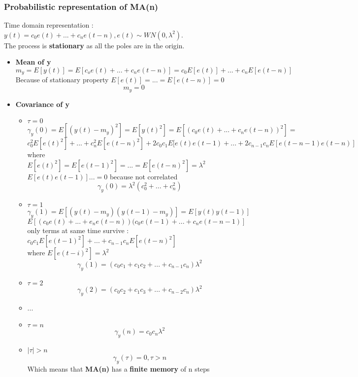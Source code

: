 \subsubsection{Probabilistic representation of MA(n)}
Time domain representation : $y(t) = c_0e(t)+...+c_ne(t-n), e(t) \sim WN(0,\lambda^2)
$.\\
The process is \textbf{stationary} as all the poles are in the origin.\\
\begin{itemize}
\item \textbf{Mean of y}\\
$$ m_y = E[y(t)] =  E[c_oe(t)+ ...+ c_ne(t-n)] = c_0E[e(t)]+...+c_nE[e(t-n)] $$ 
Because of stationary property $E[e(t)] =...=E[e(t-n)] = 0 $ 
\[
\boxed{m_y=0}
\]

\item \textbf{Covariance of y}
\begin{itemize}
\item $\tau = 0 $\\
$ \gamma_y(0) = E[(y(t)-m_y)^2] = E[y(t)^2]=E[(c_0e(t)+...+c_ne(t-n))^2] =$
$ c_0^2E[e(t)^2]+...+c_n^2E[e(t-n)^2] +2c_0c_1E[e(t)e(t-1)+...+2c_{n-1}c_nE[e(t-n-1)e(t-n)]$ \\where \\$ E[e(t)^2] = E[e(t-1)^2] =...=E[e(t-n)^2] = \lambda^2$ \\ $ E[e(t)e(t-1)]... = 0$ because not correlated \\
\[
\boxed{\gamma_y(0) = \lambda^2(c_0^2 + ...+c_n^2)}
\]
\item $\tau = 1$\\
$ \gamma_y(1)= E[(y(t)-m_y)(y(t-1)-m_y)]=E[y(t)y(t-1)]$ \\ $ E[(c_0e(t)+...+e_ne(t-n))(c_0e(t-1)+...+c_ne(t-n-1)] $ \\ only terms at same time survive : \\ 
$ c_0c_1E[e(t-1)^2]+...+c_{n-1}c_nE[e(t-n)^2] $ \\ where $E[e(t-i)^2] = \lambda^2$ \\ \[
\boxed{\gamma_y(1)= (c_0c_1+c_1c_2+...+c_{n-1}c_n)\lambda^2 }
\]
\item $\tau =2$\\
\[ 
\boxed{\gamma_y(2) = (c_0c_2+c_1c_3+...+c_{n-2}c_n)\lambda^2 }
\]
\item ...\\
\item $\tau = n$\\
\[
\boxed{\gamma_y(n) = c_0c_n\lambda^2}
\]
\item $ |\tau| > n $\\
\[
\boxed{\gamma_y(\tau) = 0 , \tau > n}
\]
Which means that \textbf{MA(n)} has a \textbf{finite memory} of n steps
\end{itemize}
\end{itemize}

